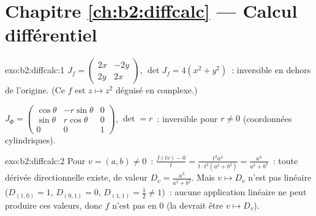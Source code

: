 \section*{Chapitre \ref{ch:b2:diffcalc} --- Calcul différentiel}

\begin{solution}{exo:b2:diffcalc:1}
$J_f = \begin{pmatrix} 2x & -2y\\ 2y & 2x\end{pmatrix}$, $\det J_f
= 4(x^2 + y^2)$~: inversible en dehors de l'origine. (Ce $f$ est $z
\mapsto z^2$ déguisé en complexe.)

$J_\Phi = \begin{pmatrix} \cos\theta & -r\sin\theta & 0\\
\sin\theta & r\cos\theta & 0\\ 0 & 0 & 1\end{pmatrix}$, $\det = r$~:
inversible pour $r \neq 0$ (coordonnées cylindriques).
\end{solution}

\begin{solution}{exo:b2:diffcalc:2}
Pour $v = (a, b) \neq 0$~: $\frac{f(tv) - 0}{t} = \frac{t^3a^3}{t\cdot
t^2(a^2+b^2)} = \frac{a^3}{a^2 + b^2}$~: toute dérivée directionnelle
existe, de valeur $D_v = \frac{a^3}{a^2+b^2}$. Mais $v
\mapsto D_v$ n'est pas linéaire ($D_{(1,0)} = 1$, $D_{(0,1)} = 0$,
$D_{(1,1)} = \frac12 \neq 1$)~: aucune application linéaire ne peut
produire ces valeurs, donc $f$ n'est pas  en $0$ (la
 devrait être $v \mapsto D_v$).
\end{solution}

